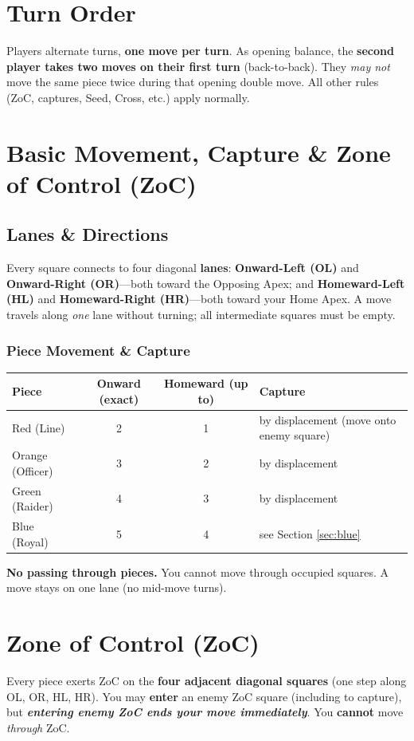 \documentclass[11pt]{article}
\begin{document}
\section{Turn Order}
\label{sec:turnorder}

Players alternate turns, \textbf{one move per turn}. As opening balance, the \textbf{second player takes two moves on their first turn} (back-to-back). They \emph{may not} move the same piece twice during that opening double move. All other rules (ZoC, captures, Seed, Cross, etc.) apply normally.

\section{Basic Movement, Capture \& Zone of Control (ZoC)}
\label{sec:movement}

\subsection*{Lanes \& Directions}
Every square connects to four diagonal \textbf{lanes}: \textbf{Onward-Left (OL)} and \textbf{Onward-Right (OR)}—both toward the Opposing Apex; and \textbf{Homeward-Left (HL)} and \textbf{Homeward-Right (HR)}—both toward your Home Apex. A move travels along \emph{one} lane without turning; all intermediate squares must be empty.

\subsubsection*{Piece Movement \& Capture}
\begin{tabularx}{\linewidth}{@{}l c c l@{}}
\toprule
\textbf{Piece} & \textbf{Onward (exact)} & \textbf{Homeward (up to)} & \textbf{Capture}\\
\midrule
Red (Line)      & 2 & 1 & by displacement (move onto enemy square)\\
Orange (Officer)& 3 & 2 & by displacement\\
Green (Raider)  & 4 & 3 & by displacement\\
Blue (Royal)    & 5 & 4 & see Section \ref{sec:blue}\\
\bottomrule
\end{tabularx}

\medskip
\noindent\textbf{No passing through pieces.} You cannot move through occupied squares. A move stays on one lane (no mid-move turns).

\section*{Zone of Control (ZoC)}
Every piece exerts ZoC on the \textbf{four adjacent diagonal squares} (one step along OL, OR, HL, HR). You may \textbf{enter} an enemy ZoC square (including to capture), but \textbf{\emph{entering enemy ZoC ends your move immediately}}. You \textbf{cannot} move \emph{through} ZoC.
\end{document}
